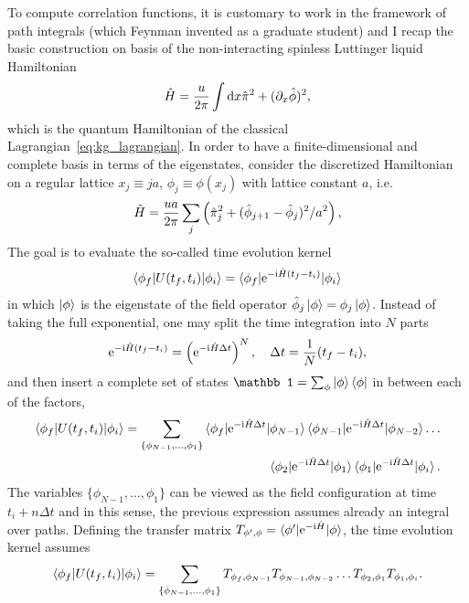 To compute correlation functions, it is customary to work in the framework of path integrals (which Feynman invented as a graduate student) and I recap the basic construction on basis of the non-interacting spinless Luttinger liquid Hamiltonian
\begin{align}
    \hat H = \frac{u}{2\pi}\int\mathrm d x\hat\pi^2+(\partial_x\hat\phi)^2,
\end{align}
which is the quantum Hamiltonian of the classical Lagrangian~\cref{eq:kg_lagrangian}.
In order to have a finite-dimensional and complete basis in terms of the eigenstates, consider the discretized Hamiltonian on a regular lattice $x_j\equiv ja$, $\phi_j\equiv\phi(x_j)$ with lattice constant $a$, i.e.
\begin{align}
    \hat H = \frac{ua}{2\pi}\sum_{j}\left( \hat\pi_{j}^2+(\hat\phi_{j+1}-\hat\phi_{j})^2/a^2 \right),
\end{align}
The goal is to evaluate the so-called time evolution kernel
\begin{align}
    \braket{\phi_f|U(t_f,t_i)|\phi_i}=\braket{\phi_f|\mathrm e^{-\mathrm i\hat H(t_f-t_i)}|\phi_i}
\end{align}
in which $\ket{\phi}$ is the eigenstate of the field operator $\hat\phi_j\ket{\phi}=\phi_j\ket{\phi}$.
Instead of taking the full exponential, one may split the time integration into $N$ parts
\begin{align}
    \mathrm e^{-\mathrm i\hat H(t_f-t_i)}=\left( \mathrm e^{-\mathrm i\hat H\Delta t} \right)^N
    ,
    \quad
    \Delta t = \frac1N(t_f-t_i)
    ,
\end{align}
and then insert a complete set of states $\mathbb1=\sum_\phi\ket{\phi}\bra{\phi}$ in between each of the factors,
\begin{align}
    \braket{\phi_f|U(t_f,t_i)|\phi_i} =
    \sum_{\{\phi_{N-1},\dots,\phi_1\}}
    \braket{\phi_f|\mathrm e^{-\mathrm i\hat H\Delta t}|\phi_{N-1}}
    \braket{\phi_{{N-1}}|\mathrm e^{-\mathrm i\hat H\Delta t}|\phi_{{N-2}}}
    \dots
    \nonumber\\
    \braket{\phi_{2}|\mathrm e^{-\mathrm i\hat H\Delta t}|\phi_{1}}
    \braket{\phi_{1}|\mathrm e^{-\mathrm i\hat H\Delta t}|\phi_i}.
\end{align}
The variables $\{\phi_{N-1},\dots,\phi_1\}$ can be viewed as the field configuration at time $t_i+n\Delta t$ and in this sense, the previous expression assumes already an integral over paths.
Defining the transfer matrix $T_{\phi',\phi}=\braket{\phi'|\mathrm e^{-\mathrm i\hat H}|\phi}$, the time evolution kernel assumes
\begin{align}
    \braket{\phi_f|U(t_f,t_i)|\phi_i} =
    \sum_{\{\phi_{N-1},\dots,\phi_1\}}
    T_{\phi_f,\phi_{{N-1}}}
    T_{\phi_{{N-1}},\phi_{{N-2}}}
    \dots
    T_{\phi_{{2}},\phi_{{1}}}
    T_{\phi_{{1}},\phi_i}.
\end{align}
